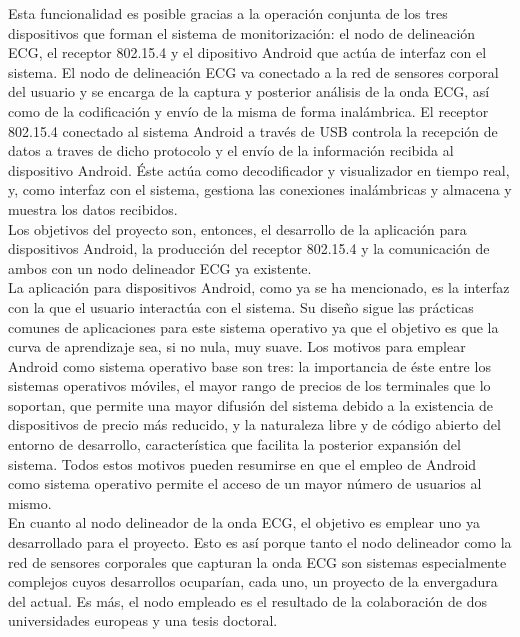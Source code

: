 	Esta funcionalidad es posible gracias a la operación conjunta de los tres dispositivos que forman el sistema de monitorización: el nodo de delineación ECG, el receptor 802.15.4 y el dipositivo Android que actúa de interfaz con el sistema. El nodo de delineación ECG va conectado a la red de sensores corporal del usuario y se encarga de la captura y posterior análisis de la onda ECG, así como de la codificación y envío de la misma de forma inalámbrica. El receptor 802.15.4 conectado al sistema Android a través de USB controla la recepción de datos a traves de dicho protocolo y el envío de la información recibida al dispositivo Android. Éste actúa como decodificador y visualizador en tiempo real, y, como interfaz con el sistema, gestiona las conexiones inalámbricas y almacena y muestra los datos recibidos.\\

	Los objetivos del proyecto son, entonces, el desarrollo de la aplicación para dispositivos Android, la producción del receptor 802.15.4 y la comunicación de ambos con un nodo delineador ECG ya existente.\\

	La aplicación para dispositivos Android, como ya se ha mencionado, es la interfaz con la que el usuario interactúa con el sistema. Su diseño sigue las prácticas comunes de aplicaciones para este sistema operativo ya que el objetivo es que la curva de aprendizaje sea, si no nula, muy suave. Los motivos para emplear Android como sistema operativo base son tres: la importancia de éste entre los sistemas operativos móviles, el mayor rango de precios de los terminales que lo soportan, que permite una mayor difusión del sistema debido a la existencia de dispositivos de precio más reducido, y la naturaleza libre y de código abierto del entorno de desarrollo, característica que facilita la posterior expansión del sistema. Todos estos motivos pueden resumirse en que el empleo de Android como sistema operativo permite el acceso de un mayor número de usuarios al mismo.\\

	En cuanto al nodo delineador de la onda ECG, el objetivo es emplear uno ya desarrollado para el proyecto. Esto es así porque tanto el nodo delineador como la red de sensores corporales que capturan la onda ECG son sistemas especialmente complejos cuyos desarrollos ocuparían, cada uno, un proyecto de la envergadura del actual. Es más, el nodo empleado es el resultado de la colaboración de dos universidades europeas y una tesis doctoral.\\

